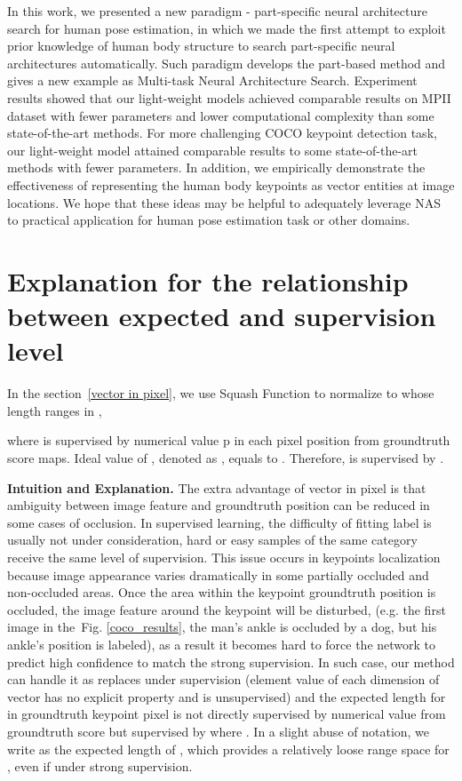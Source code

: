 \documentclass[journal]{IEEEtran}
\begin{document}
In this work, we presented a new paradigm - part-specific neural architecture search for human pose estimation, in which we made the first attempt to exploit prior knowledge of human body structure to search part-specific neural architectures automatically. Such paradigm develops the part-based method and gives a new example as Multi-task Neural Architecture Search. Experiment results showed that our light-weight models achieved comparable results on MPII dataset with fewer parameters and lower computational complexity than some state-of-the-art methods. For more challenging COCO keypoint detection task, our light-weight model attained comparable results to some state-of-the-art methods with fewer parameters. In addition, we empirically demonstrate the effectiveness of representing the human body keypoints as vector entities at image locations.  We hope that these ideas may be helpful to adequately leverage NAS to practical application for human pose estimation task or other domains.

\ifCLASSOPTIONcaptionsoff
  \newpage
\fi


 


	

\appendices

\section{Explanation for the relationship between expected  and supervision level }
\label{appendix}
In the section~\ref{vector in pixel}, we use Squash Function to normalize  to  whose length ranges in ,



where  is supervised by numerical value p in each pixel position from groundtruth score maps. Ideal value of   , denoted as , equals to . Therefore,  is supervised by . 


\textbf{Intuition and Explanation.} The extra advantage of vector in pixel is that ambiguity between image feature and groundtruth position can be reduced in some cases of occlusion. In supervised learning, the difficulty of fitting label is usually not under consideration, hard or easy samples of the same category receive the same level of supervision. This issue occurs in keypoints localization because image appearance varies dramatically in some partially occluded and non-occluded areas. Once the area within the keypoint groundtruth position is occluded, the image feature around the keypoint will be disturbed, (e.g. the first image in the~Fig. \ref{coco_results}, the man's ankle is occluded by a dog, but his ankle's position is labeled), as a result it becomes hard to force the network to predict high confidence to match the strong supervision. In such case, our method can handle it as  replaces  under supervision (element value of each dimension of vector has no explicit property and is unsupervised) and the expected length for  in groundtruth keypoint pixel is not directly supervised by numerical value  from groundtruth score but supervised by  where . In a slight abuse of notation, we write  as the expected length of , which provides a relatively loose range space for , even if under strong supervision.  
\end{document}
